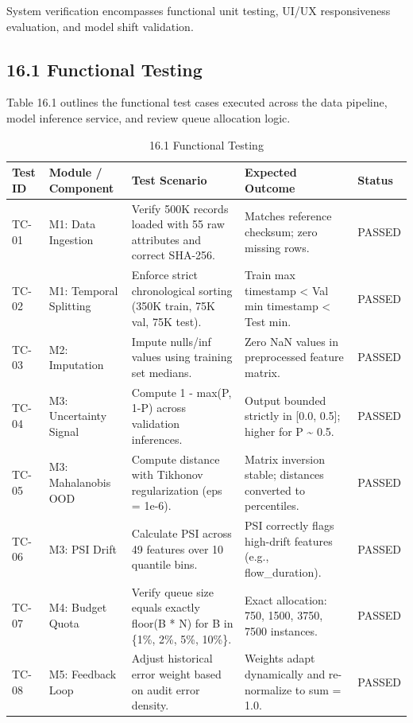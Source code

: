 System verification encompasses functional unit testing, UI/UX responsiveness evaluation, and model shift validation.

\subsection{16.1 Functional Testing}

Table 16.1 outlines the functional test cases executed across the data pipeline, model inference service, and review queue allocation logic.

\begin{table}[H]
\centering
\small
\begin{tabular}{p{} p{} p{} p{} p{}}
\toprule
\textbf{Test ID} & \textbf{Module / Component} & \textbf{Test Scenario} & \textbf{Expected Outcome} & \textbf{Status} \\
\midrule
TC-01 & M1: Data Ingestion & Verify 500K records loaded with 55 raw attributes and correct SHA-256. & Matches reference checksum; zero missing rows. & PASSED \\
TC-02 & M1: Temporal Splitting & Enforce strict chronological sorting (350K train, 75K val, 75K test). & Train max timestamp < Val min timestamp < Test min. & PASSED \\
TC-03 & M2: Imputation & Impute nulls/inf values using training set medians. & Zero NaN values in preprocessed feature matrix. & PASSED \\
TC-04 & M3: Uncertainty Signal & Compute 1 - max(P, 1-P) across validation inferences. & Output bounded strictly in [0.0, 0.5]; higher for P \textasciitilde{} 0.5. & PASSED \\
TC-05 & M3: Mahalanobis OOD & Compute distance with Tikhonov regularization (eps = 1e-6). & Matrix inversion stable; distances converted to percentiles. & PASSED \\
TC-06 & M3: PSI Drift & Calculate PSI across 49 features over 10 quantile bins. & PSI correctly flags high-drift features (e.g., flow\_duration). & PASSED \\
TC-07 & M4: Budget Quota & Verify queue size equals exactly floor(B * N) for B in \{1\%, 2\%, 5\%, 10\%\}. & Exact allocation: 750, 1500, 3750, 7500 instances. & PASSED \\
TC-08 & M5: Feedback Loop & Adjust historical error weight based on audit error density. & Weights adapt dynamically and re-normalize to sum = 1.0. & PASSED \\
\bottomrule
\end{tabular}
\caption{16.1 Functional Testing}
\end{table}

